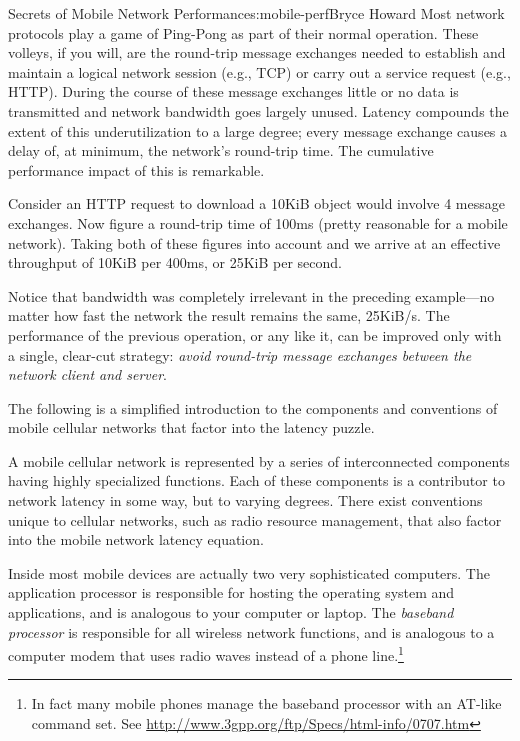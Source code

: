 \begin{aosachapter}{Secrets of Mobile Network Performance}{s:mobile-perf}{Bryce Howard}
Most network protocols play a game of Ping-Pong as part of their normal
operation. These volleys, if you will, are the round-trip message
exchanges needed to establish and maintain a logical network session
(e.g., TCP) or carry out a service request (e.g., HTTP). During the
course of these message exchanges little or no data is transmitted and
network bandwidth goes largely unused. Latency compounds the extent of
this underutilization to a large degree; every message exchange causes a
delay of, at minimum, the network's round-trip time. The cumulative
performance impact of this is remarkable.

Consider an HTTP request to download a 10KiB object would involve 4
message exchanges. Now figure a round-trip time of 100ms (pretty
reasonable for a mobile network). Taking both of these figures into
account and we arrive at an effective throughput of 10KiB per 400ms, or
25KiB per second.

Notice that bandwidth was completely irrelevant in the preceding
example---no matter how fast the network the result remains the same,
25KiB/s. The performance of the previous operation, or any like it, can
be improved only with a single, clear-cut strategy: \emph{avoid
round-trip message exchanges between the network client and server}.


The following is a simplified introduction to the components and
conventions of mobile cellular networks that factor into the latency
puzzle.

A mobile cellular network is represented by a series of interconnected
components having highly specialized functions. Each of these components
is a contributor to network latency in some way, but to varying degrees.
There exist conventions unique to cellular networks, such as radio
resource management, that also factor into the mobile network latency
equation.



Inside most mobile devices are actually two very sophisticated
computers. The application processor is responsible for hosting the
operating system and applications, and is analogous to your computer
or laptop. The \emph{baseband processor} is responsible for all wireless
network functions, and is analogous to a computer
modem that uses radio waves instead of a phone line.\footnote{In fact
  many mobile phones manage the baseband processor with an AT-like command set.
  See \url{http://www.3gpp.org/ftp/Specs/html-info/0707.htm}}


\end{aosachapter}
